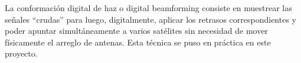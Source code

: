 \documentclass[../../main.tex]{subfiles}
\begin{document}
La conformación digital de haz o digital beamforming consiste en muestrear las señales ``crudas'' para luego, digitalmente, aplicar los retrasos correspondientes y poder apuntar simultáneamente a varios satélites sin necesidad de mover físicamente el arreglo de antenas. Esta técnica se puso en práctica en este proyecto.
\end{document}

